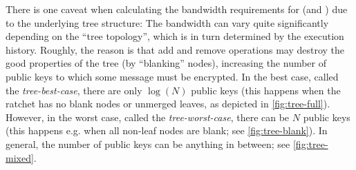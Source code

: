 There is one caveat when calculating the bandwidth requirements for \saik (and \protITK) due to the underlying tree structure: The bandwidth can vary quite
significantly depending on the ``tree topology'', which is in turn determined by the execution history. Roughly, the reason is that add and remove operations may destroy the
good properties of the tree (by ``blanking'' nodes), increasing the number of public keys to which some message must be encrypted. In the
best case, called the \emph{tree-best-case}, there are only $\log(N)$ public keys (this happens when the ratchet has no blank nodes or unmerged
leaves, as depicted in \cref{fig:tree-full}). However, in the worst case, called the \emph{tree-worst-case}, there can be
$N$ public keys (this happens e.g. when all non-leaf nodes are blank; see \cref{fig:tree-blank}). In general, the number of public keys can be anything in between; see \cref{fig:tree-mixed}.


